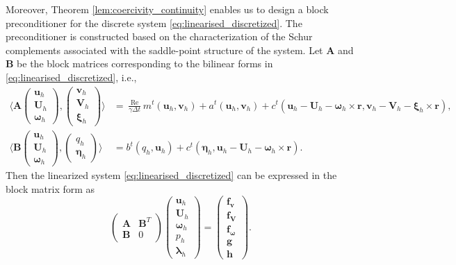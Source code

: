 \documentclass{article}
\newcommand{\bU}{{\mathbf{U}}}
\newcommand{\bu}{{\mathbf{u}}}
\newcommand{\bv}{{\mathbf{v}}}
\newcommand{\bomega}{{\boldsymbol{\omega}}}
\newcommand{\Reynolds}{{\operatorname{Re}}}
\begin{document}
Moreover, Theorem \ref{lem:coercivity_continuity} enables us to design a block preconditioner for the discrete system \eqref{eq:linearised_discretized}. The preconditioner is constructed based on the characterization of the Schur complements associated with the saddle-point structure of the system. Let $\mathbf{A}$ and $\mathbf{B}$ be the block matrices corresponding to the bilinear forms in \eqref{eq:linearised_discretized}, i.e.,
\begin{equation}
    \begin{aligned}
        \langle \mathbf{A} \begin{pmatrix} \bu_h \\ \bU_h \\ \boldsymbol{\omega}_h \end{pmatrix}, \begin{pmatrix} \bv_h \\ \mathbf{V}_h \\ \boldsymbol{\xi}_h \end{pmatrix} \rangle &= \frac{\Reynolds}{\gamma \Delta t} m^t({\bu_h}, {\bv}_h) + {a}^t(\bu_h,{\bv}_h) + {c}^t(\bu_h - {\bU}_h - \boldsymbol{\omega}_h\times \mathbf{r},\bv_h - {\mathbf{V}}_h - {\boldsymbol{\xi}}_h\times\mathbf{r}), \\
        \langle \mathbf{B}\begin{pmatrix} \bu_h \\ \bU_h \\ \boldsymbol{\omega}_h \end{pmatrix} ,\begin{pmatrix} q_h \\ \boldsymbol{\eta}_h \end{pmatrix}\rangle &= {b}^t(q_h, {\bu}_h) + {c}^t({\boldsymbol{\eta}}_h, {\bu}_h - {\bU}_h - {\boldsymbol{\omega}}_h\times\mathbf{r}).
    \end{aligned}
\end{equation}
Then the linearized system \eqref{eq:linearised_discretized} can be expressed in the block matrix form as
\begin{equation}
    \begin{pmatrix}
        \mathbf{A} & \mathbf{B}^T \\
        \mathbf{B} & 0
    \end{pmatrix}
    \begin{pmatrix}
        \bu_h \\ \bU_h \\ \boldsymbol{\omega}_h \\ p_h \\ \boldsymbol{\lambda}_h
    \end{pmatrix}
    =
    \begin{pmatrix}
        {\mathbf{f}}_\bv \\ {\mathbf{f}}_\mathbf{V} \\ {\mathbf{f}}_\bomega \\ {\mathbf{g}} \\ {\mathbf{h}}
    \end{pmatrix}.
\end{equation}
\end{document}
